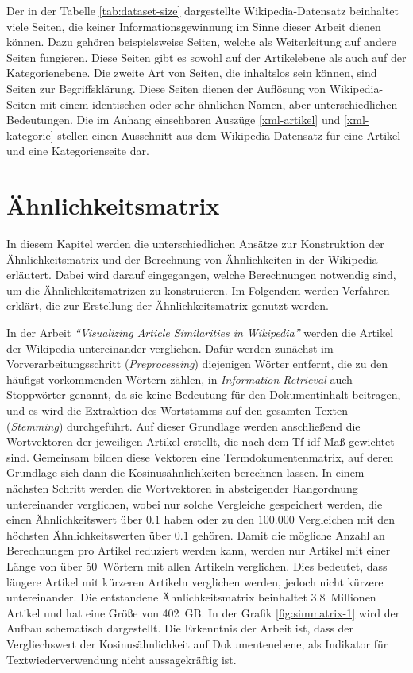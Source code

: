 Der in der Tabelle \ref{tab:dataset-size} dargestellte Wikipedia-Datensatz beinhaltet viele Seiten, die keiner Informationsgewinnung im Sinne dieser Arbeit dienen können.
Dazu gehören beispielsweise Seiten, welche als Weiterleitung auf andere Seiten fungieren.
Diese Seiten gibt es sowohl auf der Artikelebene als auch auf der Kategorienebene.
Die zweite Art von Seiten, die inhaltslos sein können, sind Seiten zur Begriffsklärung.
Diese Seiten dienen der Auflösung von Wikipedia-Seiten mit einem identischen oder sehr ähnlichen Namen, aber unterschiedlichen Bedeutungen.
Die im Anhang einsehbaren Auszüge \ref{xml-artikel} und \ref{xml-kategorie} stellen einen Ausschnitt aus dem Wikipedia-Datensatz für eine Artikel- und eine Kategorienseite dar.


 

\section{Ähnlichkeitsmatrix} \label{subchap:simmatrix}
In diesem Kapitel werden die unterschiedlichen Ansätze zur Konstruktion der Ähnlichkeitsmatrix und der Berechnung von Ähnlichkeiten in der Wikipedia erläutert.
Dabei wird darauf eingegangen, welche Berechnungen notwendig sind, um die Ähnlichkeitsmatrizen zu konstruieren.
Im Folgendem werden Verfahren erklärt, die zur Erstellung der Ähnlichkeitsmatrix genutzt werden.


In der Arbeit \emph{"`Visualizing Article Similarities in Wikipedia"'} \cite{riehmann2016visualizing} werden die Artikel der Wikipedia untereinander verglichen.
Dafür werden zunächst im Vorverarbeitungsschritt (\emph{Preprocessing}) diejenigen Wörter entfernt, die zu den häufigst vorkommenden Wörtern zählen, in \emph{Information Retrieval} auch Stoppwörter genannt, da sie keine Bedeutung für den Dokumentinhalt beitragen, und es wird die Extraktion des Wortstamms auf den gesamten Texten (\emph{Stemming}) durchgeführt.
Auf dieser Grundlage werden anschließend die Wortvektoren der jeweiligen Artikel erstellt, die nach dem Tf-idf-Ma{\ss} gewichtet sind.
Gemeinsam bilden diese Vektoren eine Termdokumentenmatrix, auf deren Grundlage sich dann die Kosinusähnlichkeiten berechnen lassen.
In einem nächsten Schritt werden die Wortvektoren in absteigender Rangordnung untereinander verglichen, wobei nur solche Vergleiche gespeichert werden, die einen Ähnlichkeitswert über $0.1$ haben oder zu den $100.000$ Vergleichen mit den höchsten Ähnlichkeitswerten über $0.1$ gehören.
Damit die mögliche Anzahl an Berechnungen pro Artikel reduziert werden kann, werden nur Artikel mit einer Länge von über 50~Wörtern mit allen Artikeln verglichen.
Dies bedeutet, dass längere Artikel mit kürzeren Artikeln verglichen werden, jedoch nicht kürzere untereinander.
Die entstandene Ähnlichkeitsmatrix beinhaltet 3.8~Millionen Artikel und hat eine Größe von 402~GB.
In der Grafik \ref{fig:simmatrix-1} wird der Aufbau schematisch dargestellt.
Die Erkenntnis der Arbeit ist, dass der Vergliechswert der Kosinusähnlichkeit auf Dokumentenebene, als Indikator für Textwiederverwendung nicht aussagekräftig ist.

